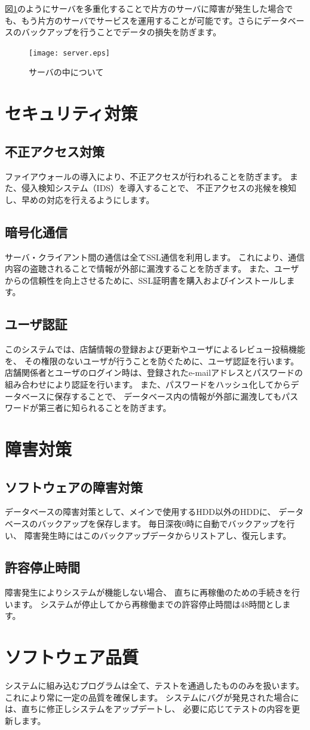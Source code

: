 \documentclass[a4j,titlepage]{jarticle}
\begin{document}
図\ref{server}のようにサーバを多重化することで片方のサーバに障害が発生した場合でも、もう片方のサーバでサービスを運用することが可能です。さらにデータベースのバックアップを行うことでデータの損失を防ぎます。
\begin{figure}[h]
  \begin{center}
    \texttt{[image: server.eps]}
    \caption{サーバの中について}
    \label{server}
  \end{center}
\end{figure}


\section{セキュリティ対策}
\subsection{不正アクセス対策}
ファイアウォールの導入により、不正アクセスが行われることを防ぎます。
また、侵入検知システム（IDS）を導入することで、
不正アクセスの兆候を検知し、早めの対応を行えるようにします。
\subsection{暗号化通信}
サーバ・クライアント間の通信は全てSSL通信を利用します。
これにより、通信内容の盗聴されることで情報が外部に漏洩することを防ぎます。
また、ユーザからの信頼性を向上させるために、SSL証明書を購入およびインストールします。
\subsection{ユーザ認証}
このシステムでは、店舗情報の登録および更新やユーザによるレビュー投稿機能を、
その権限のないユーザが行うことを防ぐために、ユーザ認証を行います。
店舗関係者とユーザのログイン時は、登録されたe-mailアドレスとパスワードの組み合わせにより認証を行います。
また、パスワードをハッシュ化してからデータベースに保存することで、
データベース内の情報が外部に漏洩してもパスワードが第三者に知られることを防ぎます。

\section{障害対策}
\subsection{ソフトウェアの障害対策}
データベースの障害対策として、メインで使用するHDD以外のHDDに、
データベースのバックアップを保存します。
毎日深夜0時に自動でバックアップを行い、
障害発生時にはこのバックアップデータからリストアし、復元します。
\subsection{許容停止時間}
障害発生によりシステムが機能しない場合、
直ちに再稼働のための手続きを行います。
システムが停止してから再稼働までの許容停止時間は48時間とします。

\section{ソフトウェア品質}
システムに組み込むプログラムは全て、テストを通過したもののみを扱います。
これにより常に一定の品質を確保します。
システムにバグが発見された場合には、直ちに修正しシステムをアップデートし、
必要に応じてテストの内容を更新します。
\end{document}
